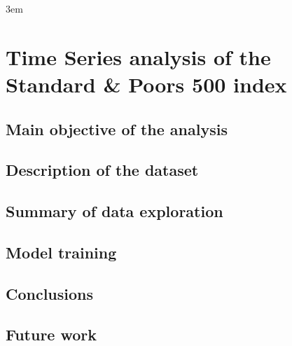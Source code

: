 \documentclass[10pt,twoside]{book}
\begin{document}
\emergencystretch 3em


\chapter{Time Series analysis of the Standard \& Poors 500 index}
\tableofcontents %
\clearpage

\section{Main objective of the analysis}

\section{Description of the dataset}

\section{Summary of data exploration}

\section{Model training}


\section{Conclusions}

\section{Future work}


% 
\end{document}
